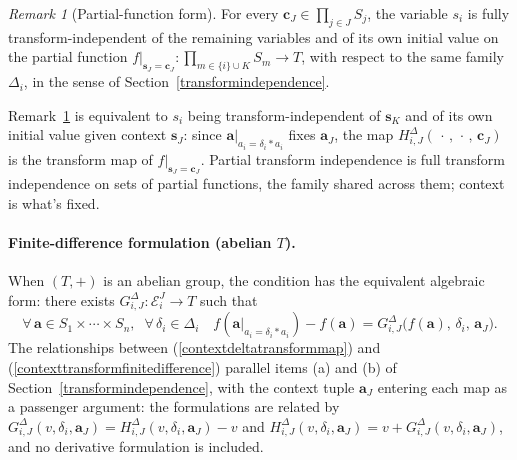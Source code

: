 \documentclass{article}
\theoremstyle{definition}
\theoremstyle{remark}
\newtheorem{remark}[proposition]{Remark}
\begin{document}
\begin{remark}[Partial-function form]
\label{transformcontextpartialform}
For every $\boldsymbol{c}_J \in \prod_{j \in J} S_j$, the variable $s_i$ is fully transform-independent of the remaining variables and of its own initial value on the partial function $f|_{\boldsymbol{s}_J = \boldsymbol{c}_J} \colon \prod_{m \in \{i\} \cup K} S_m \to T$, with respect to the same family $\Delta_i$, in the sense of Section~\ref{transformindependence}.
\end{remark}

\noindent Remark~\ref{transformcontextpartialform} is equivalent to $s_i$ being transform-independent of $\boldsymbol{s}_K$ and of its own initial value given context $\boldsymbol{s}_J$: since $\boldsymbol{a}|_{a_i = \delta_i \ast a_i}$ fixes $\boldsymbol{a}_J$, the map $H_{i,J}^\Delta(\,\cdot\,,\, \cdot\,,\, \boldsymbol{c}_J)$ is the transform map of $f|_{\boldsymbol{s}_J = \boldsymbol{c}_J}$. Partial transform independence is full transform independence on sets of partial functions, the family shared across them; context is what's fixed.

\paragraph{Finite-difference formulation (abelian $T$).} When $(T, +)$ is an abelian group, the condition has the equivalent algebraic form: there exists $G_{i,J}^\Delta \colon \mathcal{E}_i^J \to T$ such that
\begin{equation}
\label{contexttransformfinitedifference}
\forall\, \boldsymbol{a} \in S_1 \times \cdots \times S_n,\;\; \forall\, \delta_i \in \Delta_i \quad
f(\boldsymbol{a}|_{a_i = \delta_i \ast a_i}) - f(\boldsymbol{a}) = G_{i,J}^\Delta\bigl(f(\boldsymbol{a}),\, \delta_i,\, \boldsymbol{a}_J\bigr).
\end{equation}
The relationships between (\ref{contextdeltatransformmap}) and (\ref{contexttransformfinitedifference}) parallel items (a) and (b) of Section~\ref{transformindependence}, with the context tuple $\boldsymbol{a}_J$ entering each map as a passenger argument: the formulations are related by $G_{i,J}^\Delta(v, \delta_i, \boldsymbol{a}_J) = H_{i,J}^\Delta(v, \delta_i, \boldsymbol{a}_J) - v$ and $H_{i,J}^\Delta(v, \delta_i, \boldsymbol{a}_J) = v + G_{i,J}^\Delta(v, \delta_i, \boldsymbol{a}_J)$, and no derivative formulation is included.
\end{document}
